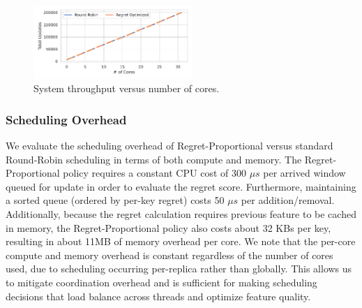 \begin{figure}[t]
\begin{center}
\includegraphics[width=6cm]{ralf/figures/scaling-april-15-10k-keys.pdf}
\centering
\end{center}
\caption{System throughput versus number of cores.}
\label{f:stl-throughput}
\end{figure}

\subsubsection{Scheduling Overhead}
\label{s:overhead}

We evaluate the scheduling overhead of Regret-Proportional versus standard Round-Robin scheduling in terms of both compute and memory. The Regret-Proportional policy requires  a constant CPU cost of 300 $\mu s$ per arrived window queued for update in order to evaluate the regret score. Furthermore, maintaining a sorted queue (ordered by per-key regret) costs 50 $\mu s$ per addition/removal. Additionally, because the regret calculation requires previous feature to be cached in memory, the Regret-Proportional policy also costs about 32 KBs per key, resulting in about 11MB of memory overhead per core. We note that the per-core compute and memory overhead is constant regardless of the number of cores used, due to scheduling occurring per-replica rather than globally. This allows us to mitigate coordination overhead and is sufficient for making scheduling decisions that load balance across threads and optimize feature quality. 



